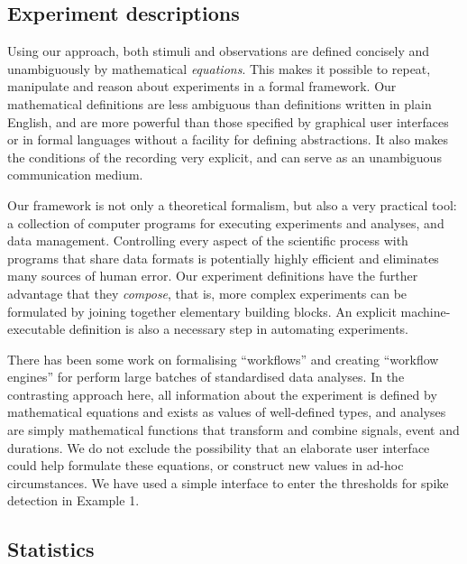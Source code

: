 \subsection*{Experiment descriptions}

Using our approach, both stimuli and observations are defined
concisely and unambiguously by mathematical \emph{equations}. This
makes it possible to repeat, manipulate and reason about experiments
in a formal framework. Our mathematical definitions are less ambiguous
than definitions written in plain English, and are more powerful than
those specified by graphical user interfaces or in formal languages
without a facility for defining abstractions. It also makes the
conditions of the recording very explicit, and can serve as an
unambiguous communication medium.

Our framework is not only a theoretical formalism, but also a very
practical tool: a collection of computer programs for executing
experiments and analyses, and data management. Controlling every
aspect of the scientific process with programs that share data formats
is potentially highly efficient and eliminates many sources of human
error. Our experiment definitions have the further advantage that they
\emph{compose}, that is, more complex experiments can be formulated by
joining together elementary building blocks. An explicit
machine-executable definition is also a necessary step in automating
experiments.

There has been some work on formalising ``workflows'' and creating
``workflow engines'' for perform large batches of standardised data
analyses. In the contrasting approach here, all information about the
experiment is defined by mathematical equations and exists as values
of well-defined types, and analyses are simply mathematical functions
that transform and combine signals, event and durations. We do not
exclude the possibility that an elaborate user interface could help
formulate these equations, or construct new values in ad-hoc
circumstances. We have used a simple interface to enter the
thresholds for spike detection in Example 1. 

\subsection*{Statistics}

